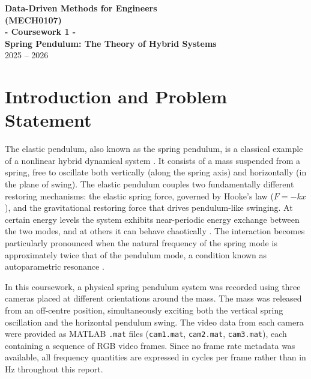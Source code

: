 \documentclass[12pt,a4paper]{article}
\begin{document}

\begin{titlepage}
    \centering
    \vspace*{1.5cm}

    {\Large \textbf{Data-Driven Methods for Engineers}}\\[0.4cm]
    {\Large \textbf{(MECH0107)}}\\[0.4cm]
    {\Large \textbf{- Coursework 1 -}}\\[1.8cm]
    {\Large \textbf{Spring Pendulum: The Theory of Hybrid Systems}}\\[1.1cm]

    {\large 2025 -- 2026}

\end{titlepage}

\tableofcontents
\newpage
{}

\section{Introduction and Problem Statement}

The elastic pendulum, also known as the spring pendulum, is a classical example of a nonlinear hybrid dynamical system \citep{breitenberger1981}. It consists of a mass suspended from a spring, free to oscillate both vertically (along the spring axis) and horizontally (in the plane of swing). The elastic pendulum couples two fundamentally different restoring mechanisms: the elastic spring force, governed by Hooke's law ($F = -kx$), and the gravitational restoring force that drives pendulum-like swinging. At certain energy levels the system exhibits near-periodic energy exchange between the two modes, and at others it can behave chaotically \citep{lynch2002}. The interaction becomes particularly pronounced when the natural frequency of the spring mode is approximately twice that of the pendulum mode, a condition known as autoparametric resonance \citep{nayfeh1979}.

In this coursework, a physical spring pendulum system was recorded using three cameras placed at different orientations around the mass. The mass was released from an off-centre position, simultaneously exciting both the vertical spring oscillation and the horizontal pendulum swing. The video data from each camera were provided as MATLAB \texttt{.mat} files (\texttt{cam1.mat}, \texttt{cam2.mat}, \texttt{cam3.mat}), each containing a sequence of RGB video frames. Since no frame rate metadata was available, all frequency quantities are expressed in cycles per frame rather than in Hz throughout this report.
\end{document}
